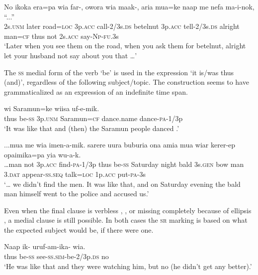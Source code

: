\ea%
\label{ex:8:x1496}
\gll No  ikoka  era=pa  wia  far-, owora  wia maak-, aria  mua=ke  naap  me  nefa  ma-i-nok,  ``...'' \\
2s.\textsc{unm} later road=\textsc{loc} 3p.\textsc{acc} call-2/3s.\textsc{ds} betelnut 3p.\textsc{acc} tell-2/3s.\textsc{ds} alright man=\textsc{cf} thus  not  2s.\textsc{acc} say-\textsc{Np}-\textsc{fu}.3s\\
\glt`Later when you see them on the road, when you ask them for betelnut, alright let your husband not say about you that {\dots}'
\z


The \textsc{ss} medial form of the verb `be' is used in the expression   `it is/was thus (and)', regardless of the following subject/topic. The construction seems to have grammaticalized as an expression of an indefinite time span.

\ea%
\label{ex:8:x1500}
\gll {}    wi  Saramun=ke  wiisa  uf-e-mik. \\
thus  be-\textsc{ss} 3p.\textsc{unm} Saramun=\textsc{cf} dance.name  dance-\textsc{pa}-1/3p      \\
\glt`It was like that and (then) the Saramun people danced .'
\z


\ea%
\label{ex:8:x1501}
\gll ...mua  me  wia  imen-a-mik.    sarere  uura buburia  ona  amia  mua  wiar  kerer-ep opaimika=pa  yia  wu-a-k.\\
{\dots}man  not  3p.\textsc{acc} find-\textsc{pa}-1/3p  thus  be-\textsc{ss} Saturday night bald 3s.\textsc{gen} bow  man 3.\textsc{dat} appear-\textsc{ss}.\textsc{seq} talk=\textsc{loc} 1p.\textsc{acc} put-\textsc{pa}-3s\\
\glt`{\dots} we didn't find the men. It was like that, and on Saturday evening the bald man himself went to the police and accused us.'
\z


Even when the final clause is verbless , , or missing completely because of ellipsis , a medial clause is still possible. In both cases the \textsc{sr} marking is based on what the expected subject would be, if there were one. 

\ea%
\label{ex:8:x1497}
\gll Naap  ik-  uruf-am-ika-  wia. \\
thus  be-\textsc{ss} see-\textsc{ss}.\textsc{sim}-be-2/3p.\textsc{ds}  no\\
\glt`He was like that and they were watching him, but no (he didn't get any better).'
\z


